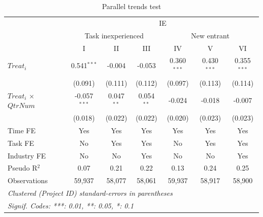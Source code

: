 \documentclass[
]{article}
\begin{document}
\begin{table}[htbp]
   \caption{Parallel trends test}
   \centering
   \small
   \begin{tabular}{lcccccc}
      \toprule
       & \multicolumn{6}{c}{IE}\\
       & \multicolumn{3}{c}{Task inexperienced} & \multicolumn{3}{c}{New entrant} \\ 
      \midrule & I & II & III & IV & V & VI\\
      \midrule 
      $Treat_i$                    & 0.541$^{***}$  & -0.004       & -0.053       & 0.360$^{***}$ & 0.430$^{***}$ & 0.355$^{***}$\\   
                                   & (0.091)        & (0.111)      & (0.112)      & (0.097)       & (0.113)       & (0.114)\\   
      $Treat_i$ $\times$ $QtrNum$  & -0.057$^{***}$ & 0.047$^{**}$ & 0.054$^{**}$ & -0.024        & -0.018        & -0.007\\   
                                   & (0.018)        & (0.022)      & (0.022)      & (0.020)       & (0.023)       & (0.023)\\   
      \midrule 
      Time FE                      & Yes            & Yes          & Yes          & Yes           & Yes           & Yes\\  
      Task FE                      & No             & Yes          & Yes          & No            & Yes           & Yes\\  
      Industry FE                  & No             & No           & Yes          & No            & No            & Yes\\  
      Pseudo R$^2$                 & 0.07           & 0.21         & 0.22         & 0.13          & 0.24          & 0.25\\  
      Observations                 & 59,937         & 58,077       & 58,061       & 59,937        & 58,917        & 58,900\\  
      \midrule
      \multicolumn{7}{l}{\emph{Clustered (Project ID) standard-errors in parentheses}}\\
      \multicolumn{7}{l}{\emph{Signif. Codes: ***: 0.01, **: 0.05, *: 0.1}}\\
   \end{tabular}
\end{table}
\end{document}
